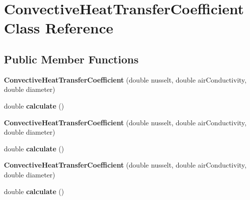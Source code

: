 \hypertarget{class_convective_heat_transfer_coefficient}{}\section{Convective\+Heat\+Transfer\+Coefficient Class Reference}
\label{class_convective_heat_transfer_coefficient}
\subsection*{Public Member Functions}
\begin{DoxyCompactItemize}
\item 
\mbox{\label{class_convective_heat_transfer_coefficient_ade8e6db6b966f2118af7ef7695570a43}} 
{\bfseries Convective\+Heat\+Transfer\+Coefficient} (double nusselt, double air\+Conductivity, double diameter)
\item 
\mbox{\label{class_convective_heat_transfer_coefficient_aa00f93c6990e6ba8c38ae099a18833f0}} 
double {\bfseries calculate} ()
\item 
\mbox{\label{class_convective_heat_transfer_coefficient_ade8e6db6b966f2118af7ef7695570a43}} 
{\bfseries Convective\+Heat\+Transfer\+Coefficient} (double nusselt, double air\+Conductivity, double diameter)
\item 
\mbox{\label{class_convective_heat_transfer_coefficient_aa00f93c6990e6ba8c38ae099a18833f0}} 
double {\bfseries calculate} ()
\item 
\mbox{\label{class_convective_heat_transfer_coefficient_ade8e6db6b966f2118af7ef7695570a43}} 
{\bfseries Convective\+Heat\+Transfer\+Coefficient} (double nusselt, double air\+Conductivity, double diameter)
\item 
\mbox{\label{class_convective_heat_transfer_coefficient_aa00f93c6990e6ba8c38ae099a18833f0}} 
double {\bfseries calculate} ()
\end{DoxyCompactItemize}



